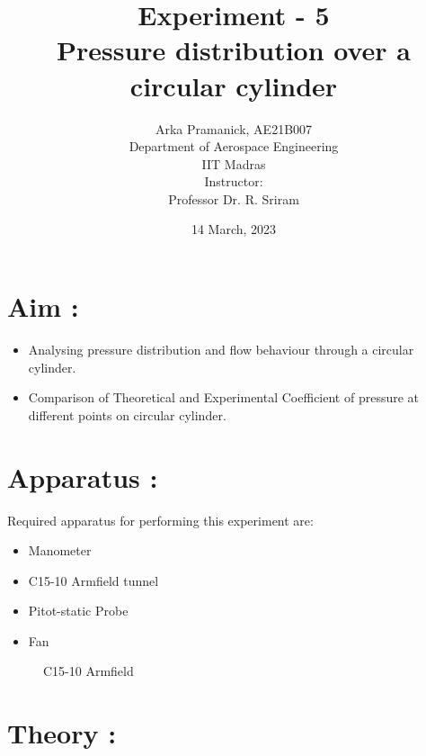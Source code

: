 \documentclass[12pt,a4paper]{article}
\title{{Experiment - 5\\ \textbf{Pressure distribution over a circular cylinder}}}
\author{Arka Pramanick, AE21B007\\ Department of Aerospace Engineering\\ IIT Madras\\[3ex] Instructor:\\ \large Professor Dr. R. Sriram}
\date{14 March, 2023}
\begin{document}
\maketitle

\hline

\section{Aim :}
\begin{itemize}
    \item Analysing pressure distribution and flow behaviour through a circular cylinder.
    \item Comparison of Theoretical and Experimental Coefficient of pressure at different points on circular cylinder.
\end{itemize}


\section{Apparatus :}
Required apparatus for performing this experiment are:
\begin{itemize}
    \item Manometer
    \item C15-10 Armfield tunnel
    \item Pitot-static Probe
    \item Fan
\end{itemize}

\begin{figure}[!ht]
	\begin{center}
	\end{center}
	\caption{C15-10 Armfield}
\end{figure}


\newpage
\section{Theory :}
\end{document}
